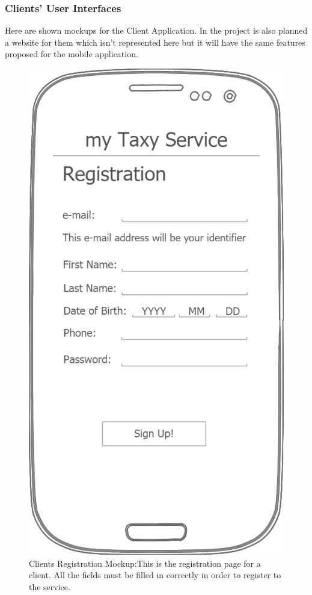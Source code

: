 \documentclass[a4paper]{article}
\begin{document}
\begin{enumerate}[label=\bfseries G\arabic*:]
\subsubsection{Clients' User Interfaces}

Here are shown mockups for the Client Application. In the project is also planned a website for them which isn't represented here but it will have the same features proposed for the mobile application.

\begin{figure}[H]
\includegraphics[width=\mockupWidth]{Mockup-ClientsRegistration}
\centering
\caption[Clients Registration Mockup]{Clients Registration Mockup:\newline This is the registration page for a client. All the fields must be filled in correctly in order to register to the service.}
\label{fig:mockupclientregistration}
\end{figure}


\end{enumerate}
\end{document}
